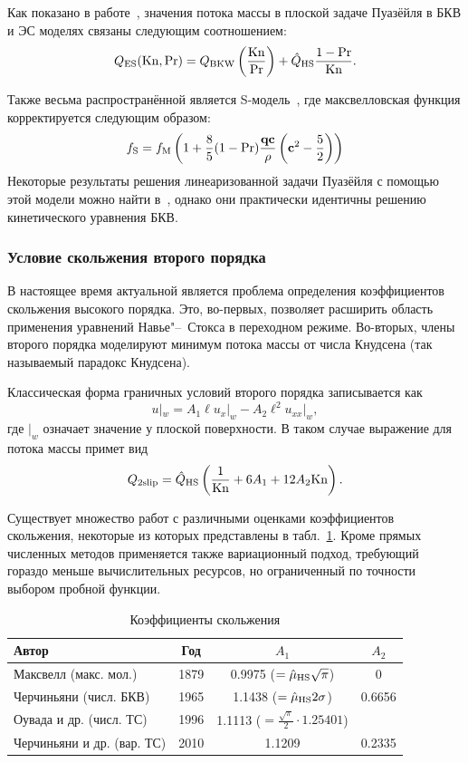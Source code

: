 Как показано в работе~\cite{Cercignani1966}, значения потока массы в плоской задаче Пуазёйля в БКВ и ЭС моделях 
связаны следующим соотношением:
\[ Q_{\rm{ES}}(\mathrm{Kn},\Pr) = Q_{\rm{BKW}}\left(\frac{\mathrm{Kn}}\Pr\right) + \hat{Q}_{\rm{HS}}\frac{1-\Pr}{\mathrm{Kn}}. \]

Также весьма распространённой является S-модель~\cite{Shakhov1968},
где максвелловская функция корректируется следующим образом:
\[ f_{\rm{S}} = f_{\rm{M}} \left( 1+\frac8{5}(1-\Pr)\frac{\bf{qc}}{\rho}\left(\mathbf{c}^2-\frac5{2}\right) \right) \]
Некоторые результаты решения линеаризованной задачи Пуазёйля с помощью этой модели можно найти в~\cite{Sharipov1999},
однако они практически идентичны решению кинетического уравнения БКВ.

\subsubsection{Условие скольжения второго порядка}

В настоящее время актуальной является проблема определения коэффициентов скольжения высокого порядка.
Это, во-первых, позволяет расширить область применения уравнений Навье"--~Стокса в переходном режиме.
Во-вторых, члены второго порядка моделируют минимум потока массы от числа Кнудсена (так называемый парадокс Кнудсена).

Классическая форма граничных условий второго порядка записывается как
\[ u|_w = A_1\ell u_x|_w - A_2\ell^2 u_{xx}|_w,  \]
где \(|_w\) означает значение у плоской поверхности.
В таком случае выражение для потока массы примет вид
\[ Q_{2\text{slip}} = \hat{Q}_{\rm{HS}}\left(\frac1{\mathrm{Kn}} + 6A_1 + 12A_2\mathrm{Kn}\right). \]

Существует множество работ с различными оценками коэффициентов скольжения,
некоторые из которых представлены в табл.~\ref{tab:slip}.
Кроме прямых численных методов применяется также вариационный подход,
требующий гораздо меньше вычислительных ресурсов, но ограниченный по точности выбором пробной функции.

\begin{table}[h]
	\centering
	\caption{Коэффициенты скольжения}\label{tab:slip}
	\begin{tabular}{l|c|c|c}
		Автор		& Год	& \(A_1\) & \(A_2\) \\
		\hline
		Максвелл \cite{Maxwell1879} (макс. мол.)		& 1879	& 0.9975 (\(=\hat{\mu}_{\rm{HS}}\sqrt{\pi}\)) & 0  \\
		Черчиньяни \cite{Cercignani1965} (числ. БКВ)	& 1965	& 1.1438 (\(=\hat{\mu}_{\rm{HS}}2\sigma\)) & 0.6656  \\
		Оувада и др. \cite{Ohwada1989a} (числ. ТС)		& 1996	& 1.1113 (\(=\frac{\sqrt{\pi}}{2}\cdot1.25401\)) &  \\
		Черчиньяни и др. \cite{Cercignani2010} (вар. ТС)& 2010	& 1.1209 & 0.2335 \\
	\end{tabular}
\end{table}

